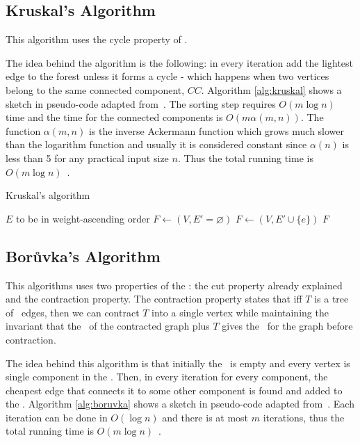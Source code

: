 \subsection*{Kruskal's Algorithm\label{sec:mst:kruskal}}
This algorithm uses the cycle property of \msts. 

The idea behind the algorithm is the following: in every iteration add the lightest edge to the forest unless it forms a cycle - which happens when two vertices belong to the same connected component, $CC$. Algorithm \ref{alg:kruskal} shows a sketch in pseudo-code adapted from~\cite{TarjanDSandNA}. The sorting step requires $O(m \log n)$ time and the time for the connected components is $O(m \alpha(m,n))$. The function $\alpha(m,n)$ is the inverse Ackermann function which grows much slower than the logarithm function and usually it is considered constant since $\alpha(n)$ is less than 5 for any practical input size $n$. Thus the total running time is $O(m \log n)$~\cite{TarjanDSandNA}.

\begin{algorithm}[H]
\caption{Kruskal's algorithm \label{alg:kruskal}}
\begin{algorithmic}
    \Require $E$ to be in weight-ascending order
        \State $F \gets (V, E' = \varnothing)$
             
                \State $F \gets (V, E' \cup \{e\})$
            \EndIf
        \EndFor            
        \State \Return $F$
    \EndProcedure
\end{algorithmic}
\end{algorithm}

\subsection*{Bor\r{u}vka's Algorithm}
This algorithms uses two properties of the \msts: the cut property already explained and the contraction property. The contraction property states that iff $T$ is a tree of \mst\ edges, then we can contract $T$ into a single vertex while maintaining the invariant that the \mst\ of the contracted graph plus $T$ gives the \mst\ for the graph before contraction.

The idea behind this algorithm is that initially the \mst\ is empty and every vertex is single component in the \mst. Then, in every iteration for every component, the cheapest edge that connects it to some other component is found and added to the \mst. Algorithm \ref{alg:boruvka} shows a sketch in pseudo-code adapted from~\cite{TarjanDSandNA}. Each iteration can be done in $O(\log n)$ and there is at most $m$ iterations, thus the total running time is $O(m \log n)$~\cite{TarjanDSandNA}.

